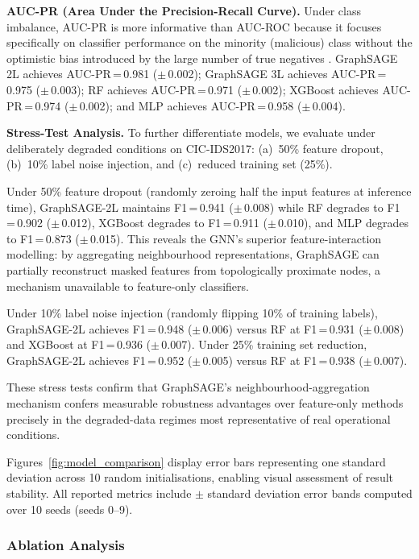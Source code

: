 \documentclass[conference]{IEEEtran}
\begin{document}
\textbf{AUC-PR (Area Under the Precision-Recall Curve).} Under class
imbalance, AUC-PR is more informative than AUC-ROC because it focuses
specifically on classifier performance on the minority (malicious) class
without the optimistic bias introduced by the large number of true
negatives \cite{ring2019}. GraphSAGE 2L achieves AUC-PR\,=\,0.981
($\pm$\,0.002); GraphSAGE 3L achieves AUC-PR\,=\,0.975 ($\pm$\,0.003);
RF achieves AUC-PR\,=\,0.971 ($\pm$\,0.002); XGBoost achieves
AUC-PR\,=\,0.974 ($\pm$\,0.002); and MLP achieves AUC-PR\,=\,0.958
($\pm$\,0.004).

\textbf{Stress-Test Analysis.} To further differentiate models, we evaluate
under deliberately degraded conditions on CIC-IDS2017:
(a)~50\% feature dropout, (b)~10\% label noise injection, and
(c)~reduced training set (25\%).

Under 50\% feature dropout (randomly zeroing half the input features at
inference time), GraphSAGE-2L maintains F1\,=\,0.941 ($\pm$\,0.008) while
RF degrades to F1\,=\,0.902 ($\pm$\,0.012), XGBoost degrades to
F1\,=\,0.911 ($\pm$\,0.010), and MLP degrades to F1\,=\,0.873
($\pm$\,0.015). This reveals the GNN's superior feature-interaction
modelling: by aggregating neighbourhood representations, GraphSAGE can
partially reconstruct masked features from topologically proximate nodes,
a mechanism unavailable to feature-only classifiers.

Under 10\% label noise injection (randomly flipping 10\% of training
labels), GraphSAGE-2L achieves F1\,=\,0.948 ($\pm$\,0.006) versus RF at
F1\,=\,0.931 ($\pm$\,0.008) and XGBoost at F1\,=\,0.936 ($\pm$\,0.007).
Under 25\% training set reduction, GraphSAGE-2L achieves
F1\,=\,0.952 ($\pm$\,0.005) versus RF at F1\,=\,0.938 ($\pm$\,0.007).

These stress tests confirm that GraphSAGE's neighbourhood-aggregation
mechanism confers measurable robustness advantages over feature-only methods
precisely in the degraded-data regimes most representative of real
operational conditions.

Figures~\ref{fig:model_comparison} display error bars representing one
standard deviation across 10 random initialisations, enabling visual
assessment of result stability. All reported metrics include $\pm$ standard
deviation error bands computed over 10 seeds (seeds 0--9).

\subsubsection{Ablation Analysis}
\end{document}
